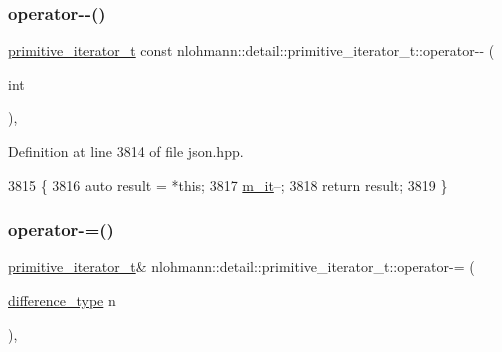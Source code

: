 \subsubsection{\texorpdfstring{operator-\/-\/()}{operator--()}\hspace{0.1cm}{\footnotesize\ttfamily [2/2]}}
{\footnotesize\ttfamily \hyperlink{classnlohmann_1_1detail_1_1primitive__iterator__t}{primitive\+\_\+iterator\+\_\+t} const nlohmann\+::detail\+::primitive\+\_\+iterator\+\_\+t\+::operator-\/-\/ (\begin{DoxyParamCaption}\item[{int}]{ }\end{DoxyParamCaption})\hspace{0.3cm}{\ttfamily [inline]}, {\ttfamily [noexcept]}}



Definition at line 3814 of file json.\+hpp.


\begin{DoxyCode}
3815     \{
3816         \textcolor{keyword}{auto} result = *\textcolor{keyword}{this};
3817         \hyperlink{classnlohmann_1_1detail_1_1primitive__iterator__t_a4357355113b0cd7e12b15c2e93703510}{m\_it}--;
3818         \textcolor{keywordflow}{return} result;
3819     \}
\end{DoxyCode}
\mbox{\label{classnlohmann_1_1detail_1_1primitive__iterator__t_a0bf83ab08abe1ae4b51c790c85cdf151}} 
\subsubsection{\texorpdfstring{operator-\/=()}{operator-=()}}
{\footnotesize\ttfamily \hyperlink{classnlohmann_1_1detail_1_1primitive__iterator__t}{primitive\+\_\+iterator\+\_\+t}\& nlohmann\+::detail\+::primitive\+\_\+iterator\+\_\+t\+::operator-\/= (\begin{DoxyParamCaption}\item[{\hyperlink{classnlohmann_1_1detail_1_1primitive__iterator__t_af3db0d5c90de427d51645fe73a015553}{difference\+\_\+type}}]{n }\end{DoxyParamCaption})\hspace{0.3cm}{\ttfamily [inline]}, {\ttfamily [noexcept]}}



